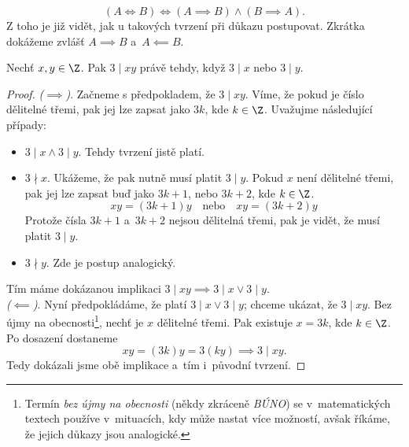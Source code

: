 \begin{equation*}
    (A \iff B) \iff (A \implies B) \land (B \implies A).
\end{equation*}
Z toho je již vidět, jak u takových tvrzení při důkazu postupovat. Zkrátka dokážeme zvlášť $A \implies B$ a~$A \impliedby B$.
\begin{proposition}
    Nechť $x,y\in\Z$. Pak $3 \mid xy$ právě tehdy, když $3 \mid x$ nebo $3 \mid y$.
\end{proposition}
\begin{proof}
    \textit{($\implies$)}. Začneme s předpokladem, že $3 \mid xy$. Víme, že pokud je číslo dělitelné třemi, pak jej lze zapsat jako $3k$, kde $k\in\Z$. Uvažujme následující případy:
    \begin{itemize}
        \item $3 \mid x \land 3 \mid y$. Tehdy tvrzení jistě platí.
        \item $3 \nmid x$. Ukážeme, že pak nutně musí platit $3 \mid y$. Pokud $x$ není dělitelné třemi, pak jej lze zapsat buď jako $3k+1$, nebo $3k+2$, kde $k\in\Z$. 
        \begin{equation*}
            xy=(3k+1)y\quad\text{nebo}\quad xy=(3k+2)y
        \end{equation*}
        Protože čísla $3k+1$ a~$3k+2$ nejsou dělitelná třemi, pak je vidět, že musí platit $3 \mid y$.
        \item $3 \nmid y$. Zde je postup analogický. 
    \end{itemize}
    Tím máme dokázanou implikaci $3 \mid xy \implies 3 \mid x \lor 3 \mid y$.\\
    \textit{($\impliedby$)}. Nyní předpokládáme, že platí $3 \mid x \lor 3 \mid y$; chceme ukázat, že $3 \mid xy$. Bez újmy na obecnosti\footnote{Termín \emph{bez újmy na obecnosti} (někdy zkráceně \emph{BÚNO}) se v~matematických textech používe v~mituacích, kdy může nastat více možností, avšak říkáme, že jejich důkazy jsou analogické.}, nechť je $x$ dělitelné třemi. Pak existuje $x=3k$, kde $k\in\Z$. Po dosazení dostaneme
    \begin{equation*}
        xy=(3k)y=3(ky) \implies 3 \mid xy.
    \end{equation*}
    Tedy dokázali jsme obě implikace a~tím i~původní tvrzení.
\end{proof}

